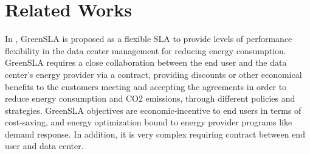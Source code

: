\section{Related Works}
\label{sec: relworks}




In \cite{botero_greenslas_2013}, GreenSLA is proposed as a flexible SLA to provide levels of performance flexibility in the data center management for reducing energy consumption. GreenSLA requires a close collaboration between the end user and the data center’s energy provider via a contract, providing discounts or other economical benefits to the customers meeting and accepting the agreements in order to reduce energy consumption and CO2 emissions, through different policies and strategies. GreenSLA objectives are economic-incentive to end users in terms of cost-saving, and energy optimization bound to energy provider programs like demand response. In addition, it is very complex requiring contract between end user and data center.


